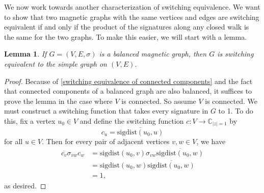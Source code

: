 \documentclass[12pt]{article}
\newtheorem{lem}[thm]{Lemma}
\theoremstyle{definition}
\newcommand{\C}{\mathbb C}
\begin{document}
We now work towards another characterization of switching equivalence. We want to show that two magnetic graphs with the same vertices and edges are switching equivalent if and only if the product of the signatures along any closed walk is the same for the two graphs. To make this easier, we will start with a lemma.

\begin{lem}\label{balanced implies switching equivalent to simple graph}
If $G=(V, E, \sigma)$ is a balanced magnetic graph, then $G$ is switching equivalent to the simple graph on $(V, E)$.
\end{lem}
\begin{proof}
Because of \cref{switching equivalence of connected components} and the fact that connected components of a balanced graph are also balanced, it suffices to prove the lemma in the case where $V$ is connected. So assume $V$ is connected. We must construct a switching function that takes every signature in $G$ to 1. To do this, fix a vertex $u_0 \in V$ and define the switching function $c: V \rightarrow \C_{|z|=1}$ by 
$$c_u = \overline{\text{sigdist} (u_0, u)}$$
for all $u \in V$. Then for every pair of adjacent vertices $v, w \in V$, we have
\begin{align*}
\overline{c_v} \sigma_{vw} c_w
&= \text{sigdist} (u_0, v) \sigma_{vw} \overline{\text{sigdist} (u_0, w)} \\
&= \text{sigdist} (u_0, w) \overline{\text{sigdist} (u_0, w)} \\
&= 1,
\end{align*}
as desired.
\end{proof}
\end{document}
